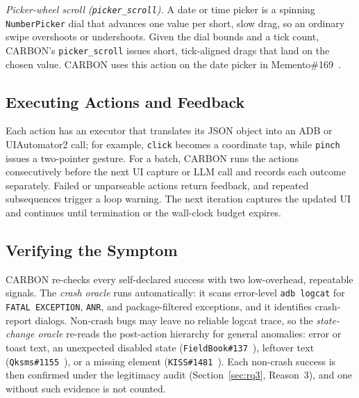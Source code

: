 \documentclass[10pt,conference,a4paper]{IEEEtran}
\begin{document}
  \emph{Picker-wheel scroll (\texttt{picker\_scroll}).} A date or time
  picker is a spinning \texttt{NumberPicker} dial that advances one value
  per short, slow drag, so an ordinary swipe overshoots or undershoots.
  Given the dial bounds and a tick count, CARBON's \texttt{picker\_scroll}
  issues short, tick-aligned drags that land on the chosen value. CARBON
  uses this action on the date picker in
  Memento\#169~\cite{memento169}.

  \subsection{Executing Actions and Feedback}
  \label{sec:approach:execute}

  Each action has an executor that translates its JSON object into an ADB
  or UIAutomator2 call; for example, \texttt{click} becomes a coordinate
  tap, while \texttt{pinch} issues a two-pointer gesture. For a batch,
  CARBON runs the actions consecutively before the next UI capture or LLM
  call and records each outcome separately. Failed or unparseable actions
  return feedback, and repeated subsequences trigger a loop warning. The
  next iteration captures the updated UI and continues until termination
  or the wall-clock budget expires.
 

  \subsection{Verifying the Symptom}
  \label{sec:approach:oracle}

  CARBON re-checks every self-declared success with two low-overhead,
  repeatable signals. The \emph{crash oracle} runs automatically: it scans
  error-level \texttt{adb logcat} for \texttt{FATAL EXCEPTION}, \texttt{ANR},
  and package-filtered exceptions, and it identifies crash-report dialogs.
  Non-crash bugs may leave no reliable logcat trace, so the \emph{state-change oracle}
  re-reads the post-action hierarchy for general anomalies: error or toast
  text, an unexpected disabled state (\texttt{FieldBook\#137}~\cite{fieldbook137}), leftover
  text (\texttt{Qksms\#1155}~\cite{qksms1155}), or a missing element
  (\texttt{KISS\#1481}~\cite{kiss1481}). Each non-crash success is then
  confirmed under the legitimacy audit (Section~\ref{sec:rq3}, Reason~3),
  and one without such evidence is not counted. %
\end{document}
